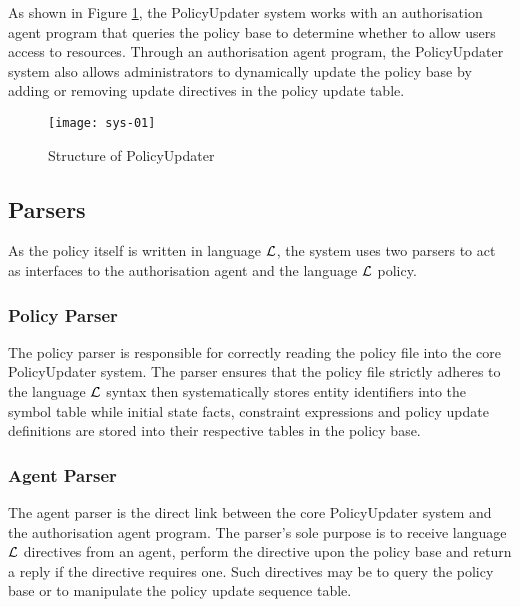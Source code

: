 \documentclass[11pt]{report}
\begin{document}
      As shown in Figure \ref{figu-polup-sysst}, the PolicyUpdater system
      works with an authorisation agent program that queries the policy base
      to determine whether to allow users access to resources. Through an
      authorisation agent program, the PolicyUpdater system also allows
      administrators to dynamically update the policy base by adding or
      removing update directives in the policy update table.

      \begin{figure}[tbhp]
        \begin{center}
          \texttt{[image: sys-01]}
          \caption{Structure of PolicyUpdater}
          \label{figu-polup-sysst}
        \end{center}
      \end{figure}

      \subsection{Parsers}
        \label{subs-polup-parse}

        As the policy itself is written in language ${\cal L}$, the system uses
        two parsers to act as interfaces to the authorisation agent and
        the language ${\cal L}$ policy.

        \subsubsection{Policy Parser}

          The policy parser is responsible for correctly reading the policy
          file into the core PolicyUpdater system. The parser ensures that
          the policy file strictly adheres to the language $\cal{L}$ syntax
          then systematically stores entity identifiers into the symbol table
          while initial state facts, constraint expressions and policy update
          definitions are stored into their respective tables in the policy
          base.

        \subsubsection{Agent Parser}

           The agent parser is the direct link between the core PolicyUpdater
          system and the authorisation agent program. The parser's sole purpose
          is to receive language $\cal{L}$ directives from an agent, perform
          the directive upon the policy base and return a reply if the
          directive requires one. Such directives may be to query the policy
          base or to manipulate the policy update sequence table.
\end{document}
